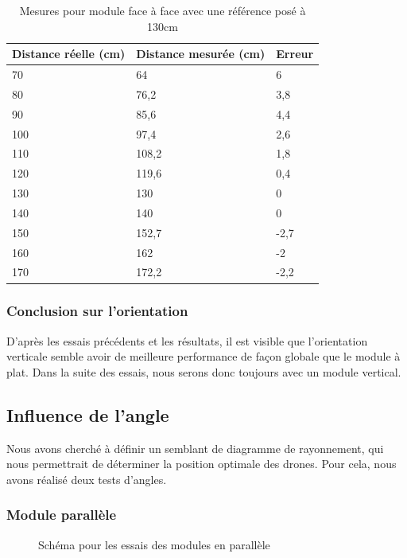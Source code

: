 \documentclass[11pt,a4paper]{article}
\begin{document}
\begin{table}[H]
    \centering
    \begin{tabular}{|l|l|l|}
    \hline
        Distance réelle (cm) & Distance mesurée (cm) & Erreur  \\ \hline
        70 & 64 & 6 \\ \hline
        80 & 76,2 & 3,8 \\ \hline
        90 & 85,6 & 4,4 \\ \hline
        100 & 97,4 & 2,6 \\ \hline
        110 & 108,2 & 1,8 \\ \hline
        120 & 119,6 & 0,4 \\ \hline
        130 & 130 & 0 \\ \hline
        140 & 140 & 0 \\ \hline
        150 & 152,7 & -2,7 \\ \hline
        160 & 162 & -2 \\ \hline
        170 & 172,2 & -2,2 \\ \hline
    \end{tabular}
    \caption{Mesures pour module face à face avec une référence posé à 130cm}
\end{table}
\subsubsection{Conclusion sur l'orientation}
D'après les essais précédents et les résultats, il est visible que l'orientation verticale semble avoir de meilleure performance de façon globale que le module à plat. 
Dans la suite des essais, nous serons donc toujours avec un module vertical.
\subsection{Influence de l'angle}
Nous avons cherché à définir un semblant de diagramme de rayonnement, qui nous permettrait de déterminer la position optimale des drones. Pour cela, nous avons réalisé deux tests d'angles.

\subsubsection{Module parallèle}
\begin{figure}[H]
  \centering
  \SchemaParalleles
  \caption{Schéma pour les essais des modules en parallèle}
\end{figure}
\end{document}
